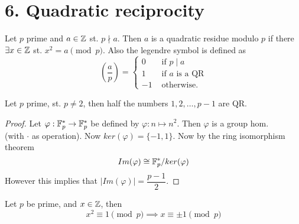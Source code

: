 \chapter*{6. Quadratic reciprocity}
\begin{definition}
  Let $p$ prime and $a \in \mathbb{Z}$ st. $p \nmid a$. Then $a$ is a quadratic residue modulo $p$ if there $\exists x \in \mathbb{Z}$ st. $x^{2} = a \pmod{p}$. Also the legendre symbol is defined as
  \begin{equation*}
    \left(\frac{a}{p}\right) = \begin{cases} 0 & \text{ if } p \mid a \\ 1 & \text{ if $a$ is a QR} \\ -1 & \text{ otherwise.} \end{cases}
  \end{equation*}
\end{definition}
\begin{proposition}
  Let $p$ prime, st. $p \neq 2$, then half the numbers $1, 2, \ldots, p - 1$ are QR.
\end{proposition}
\begin{proof}
  Let $\varphi: \mathbb{F}^{*}_{p} \to \mathbb{F}^{*}_{p}$ be defined by $\varphi: n \mapsto n^{2}$. Then $\varphi$ is a group hom. \\ (with $\cdot$ as operation). Now $ker(\varphi) = \{-1, 1\}$. Now by the ring isomorphism theorem
  \begin{equation*}
    Im(\varphi) \cong \mathbb{F}^{*}_{p} / ker(\varphi)
  \end{equation*}
  However this implies that $\lvert Im (\varphi) \rvert = \dfrac{p - 1}{2}$.
\end{proof}
\begin{lemma}
  Let $p$ be prime, and $x \in \mathbb{Z}$, then
  \begin{equation*}
    x^{2} \equiv 1 \pmod{p} \implies x \equiv \pm 1 \pmod{p}
  \end{equation*}
\end{lemma}

